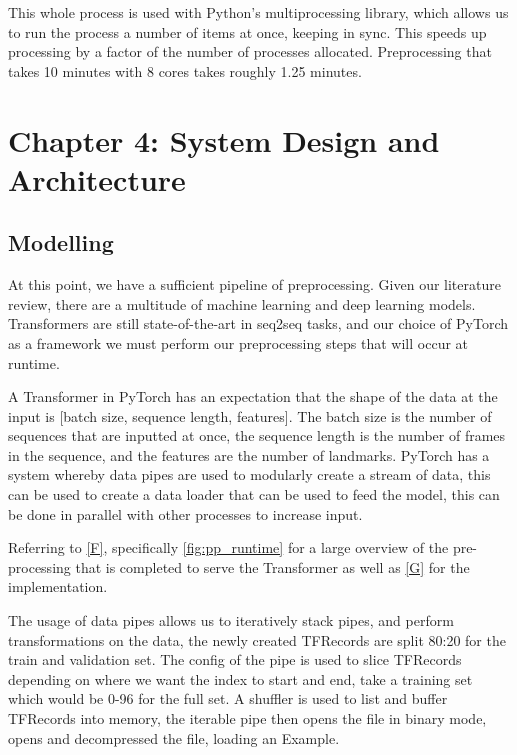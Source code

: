 \documentclass[preprint,11pt,review,authoryear]{elsarticle}
\begin{document}
This whole process is used with Python's multiprocessing library, which allows us to run the process a number of items at once, keeping in sync. This speeds up processing by a factor of the number of processes allocated. Preprocessing that takes 10 minutes with 8 cores takes roughly 1.25 minutes.

\section{Chapter 4: System Design and Architecture}

\subsection{Modelling}

At this point, we have a sufficient pipeline of preprocessing. Given our literature review, there are a multitude of machine learning and deep learning models. Transformers are still state-of-the-art in seq2seq tasks, and our choice of PyTorch as a framework we must perform our preprocessing steps that will occur at runtime.

A Transformer in PyTorch has an expectation that the shape of the data at the input is [batch size, sequence length, features]. The batch size is the number of sequences that are inputted at once, the sequence length is the number of frames in the sequence, and the features are the number of landmarks. PyTorch has a system whereby data pipes are used to modularly create a stream of data, this can be used to create a data loader that can be used to feed the model, this can be done in parallel with other processes to increase input.

Referring to \ref{F}, specifically \ref{fig:pp_runtime} for a large overview of the pre-processing that is completed to serve the Transformer as well as \ref{G} for the implementation.

The usage of data pipes allows us to iteratively stack pipes, and perform transformations on the data, the newly created TFRecords are split 80:20 for the train and validation set. The config of the pipe is used to slice TFRecords depending on where we want the index to start and end, take a training set which would be 0-96 for the full set.  A shuffler is used to list and buffer TFRecords into memory, the iterable pipe then opens the file in binary mode, opens and decompressed the file, loading an Example. 
\end{document}
